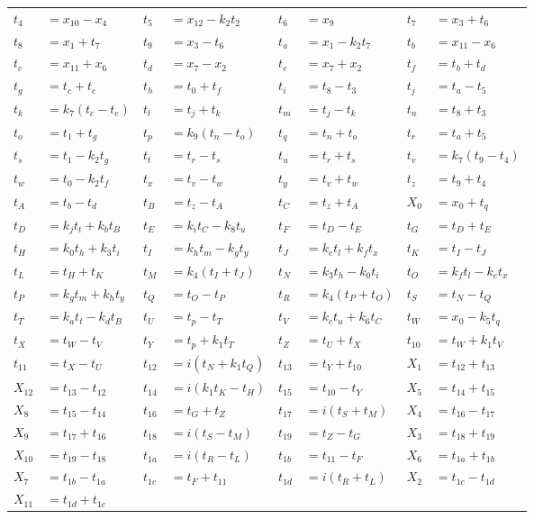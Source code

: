 \begin{tabular}{|p{4.3pt}l|p{4.3pt}l|p{4.3pt}l|p{4.3pt}l|}
$t_4 $ &$= x_{10} - x_4$ & $t_5 $ &$= x_{12} - k_2t_2$ & $t_6 $ &$= x_9$ & $t_7 $ &$= x_3 + t_6$\\ 
$t_8 $ &$= x_1 + t_7$ & $t_9 $ &$= x_3 - t_6$ & $t_a $ &$= x_1 - k_2t_7$ & $t_b $ &$= x_{11} - x_6$\\ 
$t_c $ &$= x_{11} + x_6$ & $t_d $ &$= x_7 - x_2$ & $t_e $ &$= x_7 + x_2$ & $t_f $ &$= t_b + t_d$\\ 
$t_g $ &$= t_c + t_e$ & $t_h $ &$= t_0 + t_f$ & $t_i $ &$= t_8 - t_3$ & $t_j $ &$= t_a - t_5$\\ 
$t_k $ &$= k_7(t_c - t_e)$ & $t_l $ &$= t_j + t_k$ & $t_m $ &$= t_j - t_k$ & $t_n $ &$= t_8 + t_3$\\ 
$t_o $ &$= t_1 + t_g$ & $t_p $ &$= k_9(t_n - t_o)$ & $t_q $ &$= t_n + t_o$ & $t_r $ &$= t_a + t_5$\\ 
$t_s $ &$= t_1 - k_2t_g$ & $t_t $ &$= t_r - t_s$ & $t_u $ &$= t_r + t_s$ & $t_v $ &$= k_7(t_9 - t_4)$\\ 
$t_w $ &$= t_0 - k_2t_f$ & $t_x $ &$= t_v - t_w$ & $t_y $ &$= t_v + t_w$ & $t_z $ &$= t_9 + t_4$\\ 
$t_A $ &$= t_b - t_d$ & $t_B $ &$= t_z - t_A$ & $t_C $ &$= t_z + t_A$ & $X_0 $ &$= x_0 + t_q$\\ 
$t_D $ &$= k_jt_t + k_bt_B$ & $t_E $ &$= k_it_C - k_8t_u$ & $t_F $ &$= t_D - t_E$ & $t_G $ &$= t_D + t_E$\\ 
$t_H $ &$= k_0t_h + k_3t_i$ & $t_I $ &$= k_ht_m - k_gt_y$ & $t_J $ &$= k_et_l + k_ft_x$ & $t_K $ &$= t_I - t_J$\\ 
$t_L $ &$= t_H + t_K$ & $t_M $ &$= k_4(t_I + t_J)$ & $t_N $ &$= k_3t_h - k_0t_i$ & $t_O $ &$= k_ft_l - k_et_x$\\ 
$t_P $ &$= k_gt_m + k_ht_y$ & $t_Q $ &$= t_O - t_P$ & $t_R $ &$= k_4(t_P + t_O)$ & $t_S $ &$= t_N - t_Q$\\ 
$t_T $ &$= k_at_t - k_dt_B$ & $t_U $ &$= t_p - t_T$ & $t_V $ &$= k_ct_u + k_6t_C$ & $t_W $ &$= x_0 - k_5t_q$\\ 
$t_X $ &$= t_W - t_V$ & $t_Y $ &$= t_p + k_1t_T$ & $t_Z $ &$= t_U + t_X$ & $t_{10} $ &$= t_W + k_1t_V$\\ 
$t_{11} $ &$= t_X - t_U$ & $t_{12} $ &$= i(t_N + k_1t_Q)$ & $t_{13} $ &$= t_Y + t_{10}$ & $X_1 $ &$= t_{12} + t_{13}$\\ 
$X_{12} $ &$= t_{13} - t_{12}$ & $t_{14} $ &$= i(k_1t_K - t_H)$ & $t_{15} $ &$= t_{10} - t_Y$ & $X_5 $ &$= t_{14} + t_{15}$\\ 
$X_8 $ &$= t_{15} - t_{14}$ & $t_{16} $ &$= t_G + t_Z$ & $t_{17} $ &$= i(t_S + t_M)$ & $X_4 $ &$= t_{16} - t_{17}$\\ 
$X_9 $ &$= t_{17} + t_{16}$ & $t_{18} $ &$= i(t_S - t_M)$ & $t_{19} $ &$= t_Z - t_G$ & $X_3 $ &$= t_{18} + t_{19}$\\ 
$X_{10} $ &$= t_{19} - t_{18}$ & $t_{1a} $ &$= i(t_R - t_L)$ & $t_{1b} $ &$= t_{11} - t_F$ & $X_6 $ &$= t_{1a} + t_{1b}$\\ 
$X_7 $ &$= t_{1b} - t_{1a}$ & $t_{1c} $ &$= t_F + t_{11}$ & $t_{1d} $ &$= i(t_R + t_L)$ & $X_2 $ &$= t_{1c} - t_{1d}$\\ 
$X_{11} $ &\multicolumn{7}{l|}{$= t_{1d} + t_{1c}$}\\ 
\bottomrule\end{tabular}
